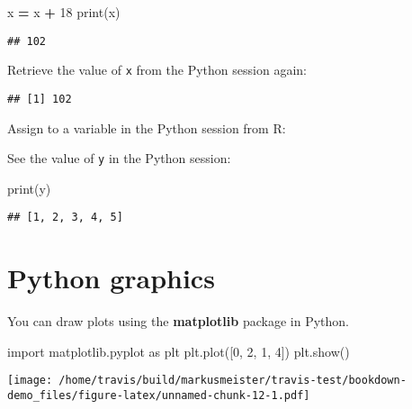 \documentclass[]{book}
\newenvironment{Shaded}{\begin{snugshade}}{\end{snugshade}}
\newcommand{\BuiltInTok}[1]{#1}
\newcommand{\DecValTok}[1]{\textcolor[rgb]{0.00,0.00,0.81}{#1}}
\newcommand{\ImportTok}[1]{#1}
\newcommand{\NormalTok}[1]{#1}
\newcommand{\OperatorTok}[1]{\textcolor[rgb]{0.81,0.36,0.00}{\textbf{#1}}}
\newcommand{\StringTok}[1]{\textcolor[rgb]{0.31,0.60,0.02}{#1}}
\begin{document}
\begin{Shaded}
\begin{Highlighting}[]
\NormalTok{x }\OperatorTok{=}\NormalTok{ x }\OperatorTok{+} \DecValTok{18} 
\BuiltInTok{print}\NormalTok{(x)}
\end{Highlighting}
\end{Shaded}

\begin{verbatim}
## 102
\end{verbatim}

Retrieve the value of \texttt{x} from the Python session again:

\begin{Shaded}
\end{Shaded}

\begin{verbatim}
## [1] 102
\end{verbatim}

Assign to a variable in the Python session from R:

\begin{Shaded}
\end{Shaded}

See the value of \texttt{y} in the Python session:

\begin{Shaded}
\begin{Highlighting}[]
\BuiltInTok{print}\NormalTok{(y)}
\end{Highlighting}
\end{Shaded}

\begin{verbatim}
## [1, 2, 3, 4, 5]
\end{verbatim}

\hypertarget{python-graphics}{%
\section{Python graphics}\label{python-graphics}}

You can draw plots using the \textbf{matplotlib} package in Python.

\begin{Shaded}
\begin{Highlighting}[]
\ImportTok{import}\NormalTok{ matplotlib.pyplot }\ImportTok{as}\NormalTok{ plt}
\NormalTok{plt.plot([}\DecValTok{0}\NormalTok{, }\DecValTok{2}\NormalTok{, }\DecValTok{1}\NormalTok{, }\DecValTok{4}\NormalTok{])}
\NormalTok{plt.show()}
\end{Highlighting}
\end{Shaded}

\texttt{[image: /home/travis/build/markusmeister/travis-test/bookdown-demo\_files/figure-latex/unnamed-chunk-12-1.pdf]}


\end{document}
